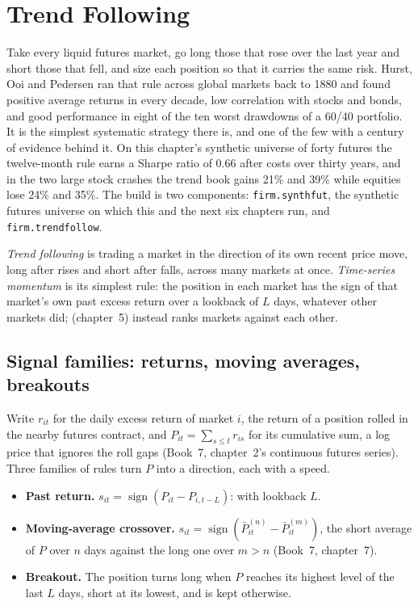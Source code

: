 \chapter{Trend Following}\label{ch:s1:trend-following}

Take every liquid futures market, go long those that rose over the last year and short those that fell, and size each position so that it carries the
same risk. Hurst, Ooi and Pedersen ran that rule across global markets back to 1880 and found positive average returns in every decade, low correlation
with stocks and bonds, and good performance in eight of the ten worst drawdowns of a 60/40 portfolio. It is the simplest systematic strategy there is,
and one of the few with a century of evidence behind it. On this chapter's synthetic universe of forty futures the twelve-month rule earns a Sharpe ratio
of 0.66 after costs over thirty years, and in the two large stock crashes the trend book gains 21\% and 39\% while equities lose 24\% and 35\%. The build
is two components: \texttt{firm.synthfut}, the synthetic futures universe on which this and the next six chapters run, and \texttt{firm.trendfollow}.

\begin{definition}\label{def:s1:trend-following:trend}
\emph{Trend following} is trading a market in the direction of its own recent price move, long after rises and short after
falls, across many markets at once. \emph{Time-series momentum} is its simplest rule: the position in each market has the
sign of that market's own past excess return over a lookback of $L$ days, whatever other markets did;  (chapter~5) instead ranks
markets against each other.
\end{definition}

\section{Signal families: returns, moving averages, breakouts}

Write $r_{it}$ for the daily excess return of market $i$, the return of a position rolled in the nearby futures contract, and $P_{it} =
\sum_{s \le t} r_{is}$ for its cumulative sum, a log price that ignores the roll gaps (Book~7, chapter~2's continuous futures series). Three families of
rules turn $P$ into a direction, each with a speed.
\begin{itemize}
\item \textbf{Past return.} $s_{it} = \operatorname{sign}(P_{it} - P_{i,t-L})$:  with lookback $L$.
\item \textbf{Moving-average crossover.} $s_{it} = \operatorname{sign}(\bar P^{(n)}_{it} - \bar P^{(m)}_{it})$, the short average of $P$ over $n$ days
against the long one over $m > n$ (Book~7, chapter~7).
\item \textbf{Breakout.} The position turns long when $P$ reaches its highest level of the last $L$ days, short at its lowest, and is kept otherwise.
\end{itemize}

